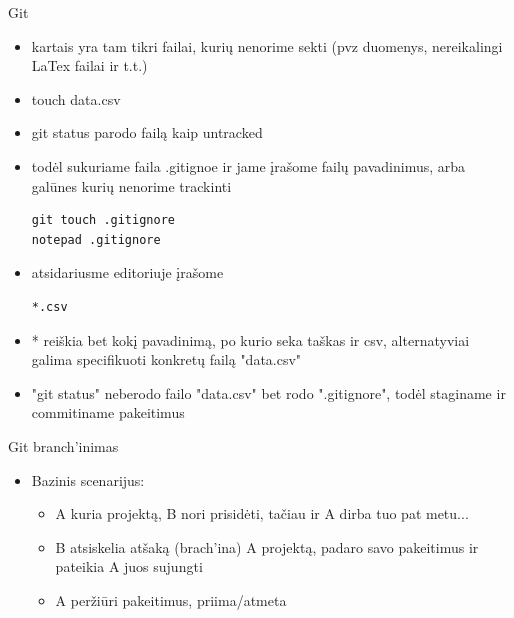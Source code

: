\documentclass[11pt,xcolor=table]{beamer}
\begin{document}
\begin{frame}[fragile]{Git}
\begin{itemize}
\item kartais yra tam tikri failai, kurių nenorime sekti (pvz duomenys, nereikalingi LaTex failai ir t.t.)
\item touch data.csv
\item git status parodo failą kaip untracked
\item todėl sukuriame faila .gitignoe ir jame įrašome failų pavadinimus, arba galūnes kurių nenorime trackinti
\begin{lstlisting}
git touch .gitignore
notepad .gitignore
\end{lstlisting}
\item atsidariusme editoriuje įrašome 
\begin{lstlisting}
*.csv 
\end{lstlisting}
\item * reiškia bet kokį pavadinimą, po kurio seka taškas ir csv, alternatyviai galima specifikuoti konkretų failą "data.csv"
\item "git status" neberodo failo "data.csv" bet rodo ".gitignore", todėl staginame ir commitiname pakeitimus
\end{itemize}
\end{frame}

\begin{frame}[fragile]{Git branch'inimas}
\begin{itemize}
\item Bazinis scenarijus:
\begin{itemize}
\item A kuria projektą, B nori prisidėti, tačiau ir A dirba tuo pat metu...
\item B atsiskelia atšaką (brach'ina) A projektą, padaro savo pakeitimus ir pateikia A juos sujungti
\item A peržiūri pakeitimus, priima/atmeta
\end{itemize}
\end{itemize}
\end{frame}
\end{document}
